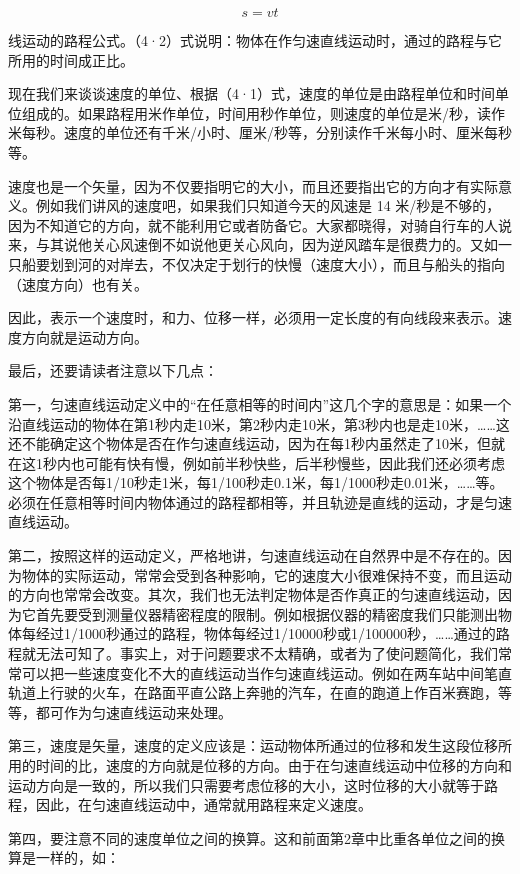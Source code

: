 \[
s = v t
\]

线运动的路程公式。（4·2）式说明：物体在作匀速直线运动时，通过的路程与它所用的时间成正比。

现在我们来谈谈速度的单位、根据（4·1）式，速度的单位是由路程单位和时间单位组成的。如果路程用米作单位，时间用秒作单位，则速度的单位是米/秒，读作米每秒。速度的单位还有千米/小时、厘米/秒等，分别读作千米每小时、厘米每秒等。

速度也是一个矢量，因为不仅要指明它的大小，而且还要指出它的方向才有实际意义。例如我们讲风的速度吧，如果我们只知道今天的风速是
14
米/秒是不够的，因为不知道它的方向，就不能利用它或者防备它。大家都晓得，对骑自行车的人说来，与其说他关心风速倒不如说他更关心风向，因为逆风踏车是很费力的。又如一只船要划到河的对岸去，不仅决定于划行的快慢（速度大小），而且与船头的指向（速度方向）也有关。

因此，表示一个速度时，和力、位移一样，必须用一定长度的有向线段来表示。速度方向就是运动方向。

最后，还要请读者注意以下几点：

第一，匀速直线运动定义中的``在任意相等的时间内''这几个字的意思是：如果一个沿直线运动的物体在第1秒内走10米，第2秒内走10米，第3秒内也是走10米，\ldots\ldots 这还不能确定这个物体是否在作匀速直线运动，因为在每1秒内虽然走了10米，但就在这1秒内也可能有快有慢，例如前半秒快些，后半秒慢些，因此我们还必须考虑这个物体是否每1/10秒走1米，每1/100秒走0.1米，每1/1000秒走0.01米，\ldots\ldots 等。必须在任意相等时间内物体通过的路程都相等，并且轨迹是直线的运动，才是匀速直线运动。

第二，按照这样的运动定义，严格地讲，匀速直线运动在自然界中是不存在的。因为物体的实际运动，常常会受到各种影响，它的速度大小很难保持不变，而且运动的方向也常常会改变。其次，我们也无法判定物体是否作真正的匀速直线运动，因为它首先要受到测量仪器精密程度的限制。例如根据仪器的精密度我们只能测出物体每经过1/1000秒通过的路程，物体每经过1/10000秒或1/100000秒，\ldots\ldots 通过的路程就无法可知了。事实上，对于问题要求不太精确，或者为了使问题简化，我们常常可以把一些速度变化不大的直线运动当作匀速直线运动。例如在两车站中间笔直轨道上行驶的火车，在路面平直公路上奔驰的汽车，在直的跑道上作百米赛跑，等等，都可作为匀速直线运动来处理。

第三，速度是矢量，速度的定义应该是：运动物体所通过的位移和发生这段位移所用的时间的比，速度的方向就是位移的方向。由于在匀速直线运动中位移的方向和运动方向是一致的，所以我们只需要考虑位移的大小，这时位移的大小就等于路程，因此，在匀速直线运动中，通常就用路程来定义速度。

第四，要注意不同的速度单位之间的换算。这和前面第2章中比重各单位之间的换算是一样的，如：

